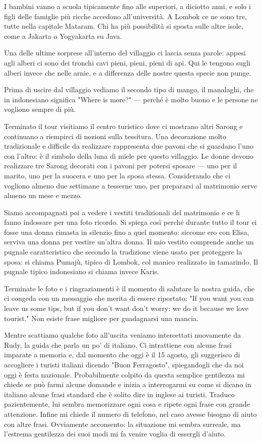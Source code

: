 I bambini vanno a scuola tipicamente fino alle superiori, a diciotto anni, e solo i figli delle famiglie più ricche accedono all'università. A Lombok ce ne sono tre, tutte nella capitale Mataram. Chi ha più possibilità si sposta sulle altre isole, come a Jakarta o Yogyakarta su Java.

Una delle ultime sorprese all'interno del villaggio ci lascia senza parole: appesi agli alberi ci sono dei tronchi cavi pieni, pieni, pieni di api. Qui le tengono sugli alberi invece che nelle arnie, e a differenza delle nostre questa specie non punge.

Prima di uscire dal villaggio vediamo il secondo tipo di mango, il manalaghi, che in indonesiano significa "Where is more?" — perché è molto buono e le persone ne vogliono sempre di più.

Terminato il tour visitiamo il centro turistico dove ci mostrano altri Sarong e continuano a riempirci di nozioni sulla tessitura. Una decorazione molto tradizionale e difficile da realizzare rappresenta due pavoni che si guardano l'uno con l'altro: è il simbolo della luna di miele per questo villaggio. Le donne devono realizzare tre Sarong decorati con i pavoni per potersi sposare — uno per il marito, uno per la suocera e uno per la sposa stessa. Considerando che ci vogliono almeno due settimane a tesserne uno, per prepararsi al matrimonio serve almeno un mese e mezzo.

Siamo accompagnati poi a vedere i vestiti tradizionali del matrimonio e ce li fanno indossare per una foto ricordo. Si spiega così perché durante tutto il tour ci fosse una donna rimasta in silenzio fino a quel momento: siccome ero con Elisa, serviva una donna per vestire un'altra donna. Il mio vestito comprende anche un pugnale caratteristico che secondo la tradizione viene usato per proteggere la sposa: si chiama Pumajù, tipico di Lombok, col manico realizzato in tamarindo. Il pugnale tipico indonesiano si chiama invece Karis.

Terminate le foto e i ringraziamenti è il momento di salutare la nostra guida, che ci congeda con un messaggio che merita di essere riportato: "If you want you can leave us some tips, but if you don't want don't worry: we do it because we love tourist." Non esiste frase migliore per guadagnarsi una mancia.

Mentre scattiamo qualche foto all'uscita veniamo intercettati nuovamente da Rudy, la guida che parla un po' di italiano. Ci intrattiene con alcune frasi imparate a memoria e, dal momento che oggi è il 15 agosto, gli suggerisco di accogliere i turisti italiani dicendo "Buon Ferragosto", spiegandogli che da noi oggi è festa nazionale. Probabilmente colpito da questa semplice gentilezza mi chiede se può farmi alcune domande e inizia a interrogarmi su come si dicano in italiano alcune frasi standard che è solito dire in inglese ai turisti. Traduco pazientemente, lui sembra memorizzare ogni cosa e ripete ogni frase con grande attenzione. Infine mi chiede il numero di telefono, nel caso avesse bisogno di aiuto con altre frasi. Ovviamente acconsento: la situazione mi sembra surreale, ma l'estrema gentilezza dei suoi modi mi fa venire voglia di essergli d'aiuto.

